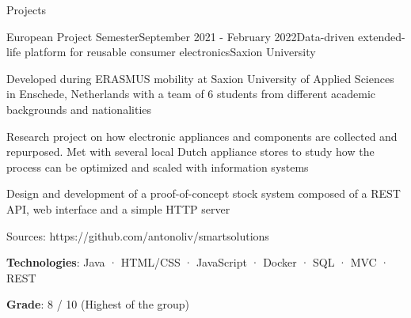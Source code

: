 \documentclass[
	11pt, %
]{cv} %
\begin{document}
\begin{rSection}{Projects}
	\begin{rSubsection}{European Project Semester}{September 2021 - February 2022}{Data-driven extended-life platform for reusable consumer electronics}{Saxion University}
		\item Developed during ERASMUS mobility at Saxion University of Applied Sciences in Enschede, Netherlands with a team of 6 students from different academic backgrounds and nationalities
		\item Research project on how electronic appliances and components are collected and repurposed. Met with several local Dutch appliance stores to study how the process can be optimized and scaled with information systems
		\item Design and development of a proof-of-concept stock system composed of a REST API, web interface and a simple HTTP server
		\item Sources: https://github.com/antonoliv/smartsolutions
		\item \textbf{Technologies}: Java · HTML/CSS · JavaScript · Docker · SQL · MVC · REST
		\item \textbf{Grade}: 8 / 10 (Highest of the group)
	\end{rSubsection}
	
\end{rSection}


\end{document}
